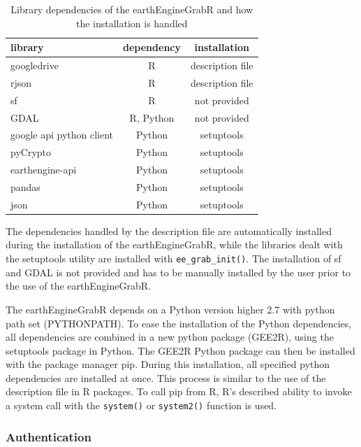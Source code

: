 \begin{table}[h]
	\begin{tabularx}{\textwidth}{|X|C|C|}
		\hline
		\textbf{library} & \textbf{dependency} & \textbf{installation}  \\
		\hline
		googledrive & R  & description file  \\
		rjson & R  & description file  \\
		sf & R  & not provided  \\
		GDAL & R, Python  & not provided  \\
		google api python client & Python  & setuptools  \\
		pyCrypto & Python  & setuptools  \\
		earthengine-api & Python  & setuptools  \\        
		pandas & Python  & setuptools  \\        
		json & Python  & setuptools  \\        
		\hline
	\end{tabularx}
	\caption{Library dependencies of the earthEngineGrabR and how the installation is handled}
	\label{dependencies}
\end{table}

The dependencies handled by the description file are automatically installed during the installation of the earthEngineGrabR, while the libraries dealt with the setuptools utility are installed with \texttt{ee\_grab\_init()}. The installation of sf and GDAL is not provided and has to be manually installed by the user prior to the use of the earthEngineGrabR.

The earthEngineGrabR depends on a Python version higher 2.7 with python path set (PYTHONPATH). To ease the installation of the Python dependencies, all dependencies are combined in a new python package (GEE2R), using the setuptools package in Python. The GEE2R Python package can then be installed with the package manager pip. During this installation, all specified python dependencies are installed at once. This process is similar to the use of the description file in R packages. To call pip from R, R's described ability to invoke a system call with the \texttt{system()} or \texttt{system2()} function is used.

\subsubsection{Authentication}

